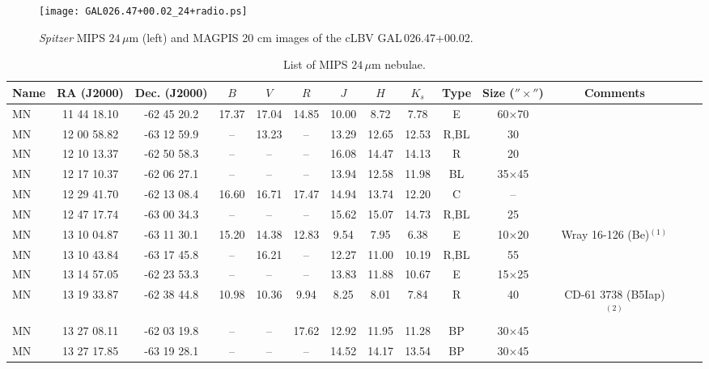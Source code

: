 \documentclass[useAMS]{mn2e}
\newcounter{qub}
\newcommand{\qq}{\addtocounter{qub}{1}\arabic{qub}}
\begin{document}
%
\begin{figure}
\begin{center}
\texttt{[image: GAL026.47+00.02\_24+radio.ps]}
\end{center}
\caption{{\it Spitzer} MIPS $24 \, \mu$m (left) and MAGPIS 20 cm images of the cLBV GAL\,026.47+00.02.}
\label{fig:GAL026.47+00.02(24+radio)}
\end{figure}
%

%
\begin{table*}
\caption{List of MIPS $24\,\mu$m nebulae.} \label{catalog}
\centering
\renewcommand{\footnoterule}{}  %
\begin{tabular}{lccccccccccccc}
\hline
Name & RA (J2000) & Dec. (J2000) & $B$ & $V$ & $R$ & $J$ & $H$ & $K_s$ & Type & Size ($''\times ''$) & Comments \\
\hline
MN\qq & 11 44 18.10 & -62 45 20.2 & 17.37 & 17.04 & 14.85 & 10.00 & 8.72 & 7.78 & E & 60$\times$70 & \\
MN\qq    & 12 00 58.82 & -63 12 59.9 & -- & 13.23 & -- & 13.29 & 12.65 & 12.53 & R,BL & 30 & \\
MN\qq & 12 10 13.37 & -62 50 58.3 & -- & -- & -- & 16.08 & 14.47 & 14.13 & R & 20 & \\
MN\qq & 12 17 10.37 & -62 06 27.1 & -- & -- & -- & 13.94 & 12.58 & 11.98 & BL & 35$\times$45  & \\
MN\qq & 12 29 41.70 & -62 13 08.4 & 16.60 & 16.71 & 17.47 & 14.94 & 13.74 & 12.20 & C & -- & \\
MN\qq & 12 47 17.74 & -63 00 34.3 & -- & -- & -- & 15.62 & 15.07 & 14.73 & R,BL & 25 &  \\
MN\qq & 13 10 04.87 & -63 11 30.1 & 15.20 & 14.38 & 12.83 & 9.54 & 7.95 & 6.38 & E & 10$\times$20 & Wray 16-126 (Be)$^{(1)}$ \\
MN\qq & 13 10 43.84 & -63 17 45.8 & -- & 16.21 & -- & 12.27 & 11.00 & 10.19 & R,BL & 55 &  \\
MN\qq & 13 14 57.05 & -62 23 53.3 & -- & -- & -- & 13.83 & 11.88 & 10.67 & E & 15$\times$25 &  \\
MN\qq & 13 19 33.87 & -62 38 44.8 & 10.98 & 10.36 & 9.94 & 8.25 & 8.01 & 7.84 & R & 40 & CD-61 3738 (B5Iap)$^{(2)}$ \\
MN\qq & 13 27 08.11 & -62 03 19.8 & -- & -- & 17.62 & 12.92 & 11.95 & 11.28 & BP & 30$\times$45 &  \\
MN\qq & 13 27 17.85 & -63 19 28.1 & -- & -- & -- & 14.52 & 14.17 & 13.54 & BP & 30$\times$45&  \\

\end{tabular}
\end{table*}
\end{document}
